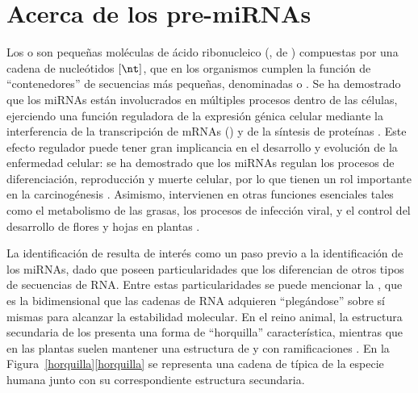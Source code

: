 %
%
%
\section{Acerca de los pre-miRNAs}
%
Los \e{} o  son pequeñas moléculas de
ácido ribonucleico (, de ) compuestas por
una cadena de %
nucleótidos $[\nt]$, que en los organismos cumplen la función de
``contenedores'' de secuencias más pequeñas, denominadas 
o .
Se ha demostrado que los miRNAs están involucrados en múltiples
procesos dentro de las células, ejerciendo una función reguladora de
la expresión génica celular mediante la interferencia de la
transcripción de mRNAs () y de la síntesis de
proteínas \cite{lee-mammal} \cite{bartel116} \cite{lili}.
Este efecto regulador puede tener gran implicancia en el desarrollo y
evolución de la enfermedad celular:
se ha demostrado que los miRNAs regulan los procesos de
diferenciación, reproducción y muerte celular, por lo que tienen un
rol importante en la carcinogénesis \cite{aurora,lili}.
Asimismo, intervienen en otras funciones esenciales tales como el
metabolismo de las grasas, los procesos de infección viral, y el
control del desarrollo de flores y hojas en plantas
\cite{bartel116,lecellier}.

La identificación de  resulta de interés como un paso
previo a la identificación de los miRNAs, dado que poseen
particularidades que los diferencian de otros tipos de secuencias de
RNA.
Entre estas particularidades se puede mencionar la , que es la  bidimensional que las cadenas de
RNA adquieren ``plegándose'' sobre sí mismas para alcanzar la
estabilidad molecular.
En el reino animal, la estructura secundaria de los 
presenta una forma de ``horquilla'' característica, mientras que en
las plantas suelen mantener una estructura de  y 
con ramificaciones \cite{bartel116,sewer}.
En la \iflatexml{}Figura~\ref{horquilla}\else\autoref{horquilla}\fi{}
se representa una cadena de \premirna{} típica de la especie humana
junto con su correspondiente estructura secundaria.

